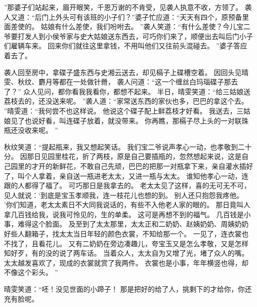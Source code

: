 ”那婆子们站起来，眉开眼笑，千恩万谢的不肯受，见袭人执意不收，方领了。
袭人又道：“后门上外头可有该班的小子们？”婆子忙应道：“天天有四个，原预备里面差使的。
姑娘有什么差使，我们吩咐去。
”袭人笑道：“有什么差使？今儿宝二爷要打发人到小侯爷家与史大姑娘送东西去，可巧你们来了，顺便出去叫后门小子们雇辆车来。
回来你们就往这里拿钱，不用叫他们又往前头混碰去。
”婆子答应着去了。
\par
袭人回至房中，拿碟子盛东西与史湘云送去，却见槅子上碟槽空着。
因回头见晴雯、秋纹、麝月等都在一处做针黹，
袭人问道：“这一个缠丝白玛瑙碟子那去了？”
众人见问，都你看我我看你，都想不起来。
半日，晴雯笑道：“给三姑娘送荔枝去的，还没送来呢。
”袭人道：“家常送东西的家伙也多，巴巴的拿这个去。
”晴雯道：“我何尝不也这样说。
他说这个碟子配上鲜荔枝才好看。
我送去，三姑娘见了也说好看，叫连碟子放着，就没带来。
你再瞧，那槅子尽上头的一对联珠瓶还没收来呢。
”\par
秋纹笑道：“提起瓶来，我又想起笑话。
我们宝二爷说声孝心一动，也孝敬到二十分。
因那日见园里桂花，折了两枝，原是自己要插瓶的，忽然想起来说，这是自己园里的才开的新鲜花，不敢自己先顽，巴巴的把那一对瓶拿下来，亲自灌水插好了，叫个人拿着，亲自送一瓶进老太太，又进一瓶与太太。
谁知他孝心一动，连跟的人都得了福了。
可巧那日是我拿去的。
老太太见了这样，喜的无可无不可，见人就说：‘到底是宝玉孝顺我，连一枝花儿也想的到。
别人还只抱怨我疼他。
’你们知道，老太太素日不大同我说话的，有些不入他老人家的眼的。
那日竟叫人拿几百钱给我，说我可怜见的，生的单柔。
这可是再想不到的福气。
几百钱是小事，难得这个脸面。
及至到了太太那里，太太正和二奶奶、赵姨奶奶、周姨奶奶好些人翻箱子，找太太当日年轻的颜色衣裳，不知给那一个。
一见了，连衣裳也不找了，且看花儿。
又有二奶奶在旁边凑趣儿，夸宝玉又是怎么孝敬，又是怎样知好歹，有的没的说了两车话。
当着众人，太太自为又增了光，堵了众人的嘴。
太太越发喜欢了，现成的衣裳就赏了我两件。
衣裳也是小事，年年横竖也得，却不像这个彩头。
”
\par
晴雯笑道：“呸！没见世面的小蹄子！
那是把好的给了人，挑剩下的才给你，你还充有脸呢。
